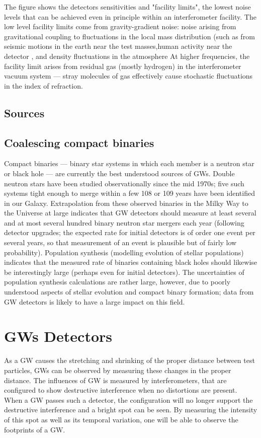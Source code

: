 \documentclass[binding=0.6cm, LaM]{sapthesis}
\begin{document}
The figure shows the detectors sensitivities and "facility limits", the lowest noise levels that can be achieved even in principle within an interferometer facility. The low level facility limits come from gravity-gradient noise: noise arising from gravitational coupling to fluctuations in the local mass distribution (such as from seismic motions in the earth near the test masses,human activity near the detector , and density fluctuations in the atmosphere At higher frequencies, the facility limit arises from residual gas (mostly hydrogen) in the interferometer vacuum system — stray molecules of gas effectively cause stochastic fluctuations in the index of refraction.
\subsection{Sources}
\subsection{Coalescing compact binaries}
Compact binaries — binary star systems in which each member is a neutron star or black hole — are currently the best understood sources of GWs. Double neutron stars have been studied observationally since the mid 1970s; five such systems tight enough to merge within a few 108 or 109 years have been identified in our Galaxy. Extrapolation from these observed binaries in the Milky Way to the Universe at large indicates that GW detectors should measure at least several and at most several hundred binary neutron star mergers each year (following detector upgrades; the expected rate for initial detectors is of order one event per several years, so that measurement of an event is plausible but of fairly low probability). Population synthesis (modelling evolution of stellar populations) indicates that the measured rate of binaries containing black holes should likewise be interestingly large (perhaps even for initial detectors). The uncertainties of population synthesis calculations are rather large, however, due to poorly understood aspects of stellar evolution and compact binary formation; data from GW detectors is likely to have a large impact on this field. 
\section{GWs Detectors}
As a GW causes the stretching and shrinking of the proper distance between test particles, GWs can be observed by measuring these changes in the proper distance. The influences of GW is measured by interferometers, that are configured to show destructive interference when no distortions are present. When a GW passes such a detector, the configuration will no longer support the destructive interference and a bright spot can be seen. By measuring the intensity of this spot as well as its temporal variation, one will be able to observe the footprints of a GW. 
\end{document}

